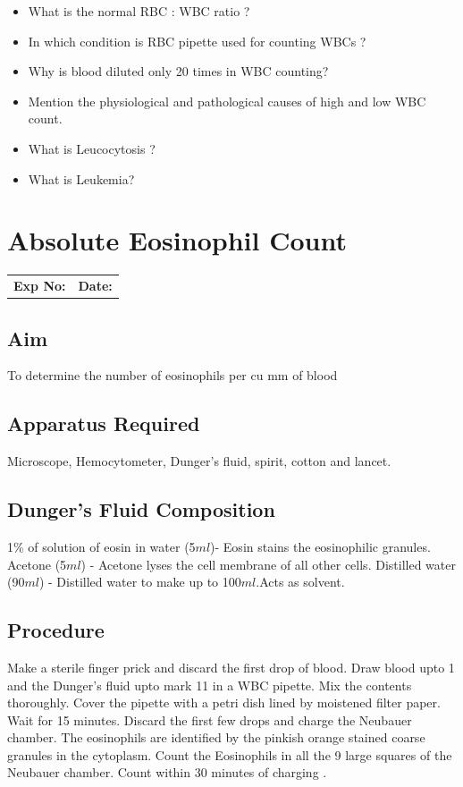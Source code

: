 \documentclass[a4paper,12pt]{book}
\begin{document}
\begin{itemize}

\item{What is the normal RBC : WBC ratio ?}
\item{ In which condition is RBC pipette used for counting WBCs ?}
\item{ Why is blood diluted only 20 times in WBC counting?}
\item{ Mention the physiological and pathological causes of high and low WBC count.}
\item{ What is Leucocytosis ?}
\item{ What is Leukemia?}
\end{itemize}

\chapter*{\centering Absolute Eosinophil Count}

		\begin{tabular}{p{5in} p{1in}}
			\textbf{Exp No:}  & \textbf{Date:}\\
		\end{tabular}

	\section*{Aim}

To determine the number of eosinophils per cu mm of blood
	\section*{Apparatus Required}
Microscope, Hemocytometer, Dunger’s fluid, spirit, cotton and lancet.
	\section*{Dunger's Fluid Composition}
1\% of solution of eosin in water (5$ml$)- Eosin stains the eosinophilic granules.\newline
Acetone (5$ml$) - Acetone lyses the cell membrane of all other cells.\newline
Distilled water (90$ml$) - Distilled water to make up to 100$ml$.Acts as solvent.\newline
	\section*{Procedure}
Make a sterile finger prick and discard the first drop of blood. Draw blood upto 1 and the Dunger’s fluid upto mark 11 in a WBC pipette. Mix the contents thoroughly. Cover the pipette with a petri dish lined by moistened filter paper. Wait for 15 minutes. Discard the first few drops and charge the Neubauer chamber. The eosinophils are identified by the pinkish orange stained coarse granules in the cytoplasm. Count the Eosinophils in all the 9 large squares of the Neubauer chamber. Count within 30 minutes of charging .
\end{document}
